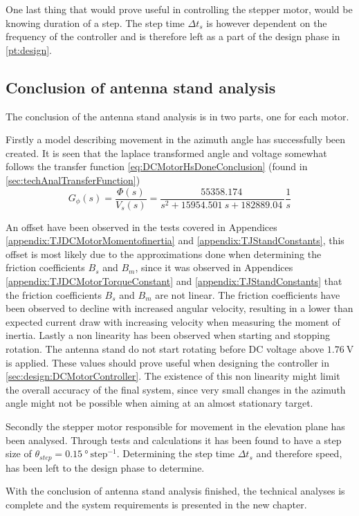 One last thing that would prove useful in controlling the stepper motor, would be knowing duration of a step. The step time $\Delta t_{s}$ is however dependent on the frequency of the controller and is therefore left as a part of the design phase in \autoref{pt:design}.

\subsection{Conclusion of antenna stand analysis}\label{sec:ConclusionAntennaStandAnalysis}
The conclusion of the antenna stand analysis is in two parts, one for each motor. 

Firstly a model describing movement in the azimuth angle has successfully been created. It is seen that the laplace transformed angle and voltage somewhat follows the transfer function \autoref{eq:DCMotorHsDoneConclusion} (found in \autoref{sec:techAnalTransferFunction})
\begin{equation}
G_\phi (s)=\frac{\Phi (s)}{V_s(s)}=\frac{\SI{55358.174}{}}{s^2+ \SI{15954.501}{} s +\SI{182889.04}{}} \frac{1}{s}\label{eq:DCMotorHsDoneConclusion}
\end{equation}

An offset have been observed in the tests covered in Appendices \ref{appendix:TJDCMotorMomentofinertia} and \ref{appendix:TJStandConstants}, this offset is most likely due to the approximations done when determining the friction coefficients $B_s$ and $B_m$, since it was observed in Appendices \ref{appendix:TJDCMotorTorqueConstant} and \ref{appendix:TJStandConstants} that the friction coefficients $B_s$ and $B_m$ are not linear. The friction coefficients have been observed to decline with increased angular velocity, resulting in a lower than expected current draw with increasing velocity when measuring the moment of inertia. Lastly a non linearity has been observed when starting and stopping rotation. The antenna stand do not start rotating before DC voltage above $\SI{1.76}{\volt}$ is applied. These values should prove useful when designing the controller in \autoref{sec:design:DCMotorController}. The existence of this non linearity might limit the overall accuracy of the final system, since very small changes in the azimuth angle might not be possible when aiming at an almost stationary target.

Secondly the stepper motor responsible for movement in the elevation plane has been analysed. Through tests and calculations it has been found to have a step size of $\theta_{step} = \SI{0.15}{\degree}~\text{step}^{-1}$. Determining the step time $\Delta t_{s}$ and therefore speed, has been left to the design phase to determine.

With the conclusion of antenna stand analysis finished, the technical analyses is complete and the system requirements is presented in the new chapter. 